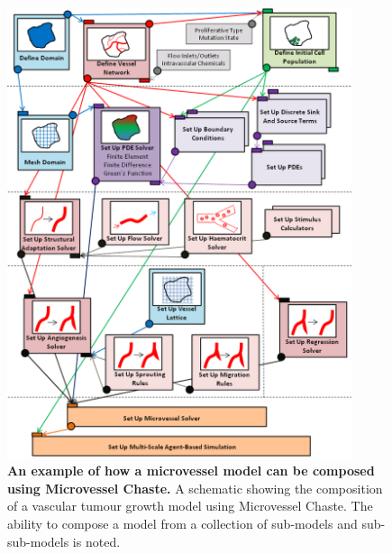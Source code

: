 \documentclass[10pt,letterpaper]{article}
\begin{document}
\begin{figure}[!h]
\centering
\includegraphics[width=0.9\textwidth]{Fig1.png}
\caption{{\bf An example of how a microvessel model can be composed using Microvessel Chaste.}
A schematic showing the composition of a vascular tumour growth model using Microvessel Chaste. The ability to compose a model from a collection of sub-models and sub-sub-models is noted.}
\label{fig1}
\end{figure}
\end{document}
